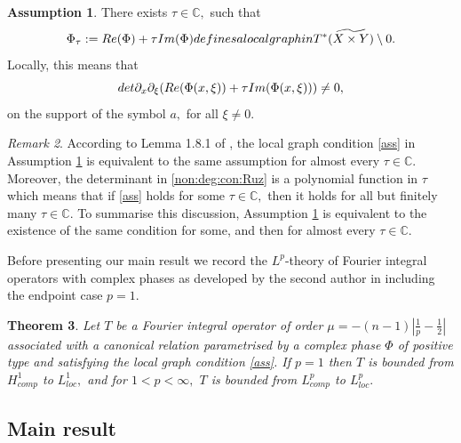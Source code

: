 \documentclass[12pt, reqno]{amsart}
\newtheorem{theorem}{Theorem}[section]
\theoremstyle{definition}
\newtheorem{assumption}[theorem]{Assumption}
\theoremstyle{remark}
\newtheorem{remark}[theorem]{Remark}
\numberwithin{equation}{section}
\begin{document}
\begin{assumption}\label{assumption:local:graph}
 There exists $\tau\in \mathbb{C},$ such that 
    \begin{equation}\label{ass}
     \Phi_\tau:=   \textnormal{Re}(\Phi)+\tau\textnormal{Im}(\Phi) \textnormal{ defines }\textnormal{ a } \textnormal{ local } \textnormal{ graph } \textnormal{ in }T^{*}(\widetilde{X\times Y})\setminus 0.
    \end{equation}   Locally, this means that 
\begin{equation}\label{non:deg:con:Ruz}
        \textnormal{det}\partial_x \partial_\xi(\textnormal{Re}(\Phi(x,\xi))+\tau\textnormal{Im}(\Phi(x,\xi)))\neq 0,
\end{equation}
on the support of the symbol $a,$  for all $\xi\neq 0.$
\end{assumption}
\begin{remark}
    According to Lemma 1.8.1 of \cite{Ruzhansky:CWI-book}, the local graph condition \eqref{ass} in Assumption \ref{assumption:local:graph} is equivalent to the same assumption for almost every $\tau\in \mathbb{C}.$ Moreover, the determinant in  \eqref{non:deg:con:Ruz} is a polynomial function in $\tau$ which means that if   \eqref{ass} holds for some $\tau\in \mathbb{C},$ then it holds for all but finitely many $\tau \in \mathbb{C}.$ To summarise this discussion, Assumption \ref{assumption:local:graph} is equivalent to the existence of the same condition for some, and then for almost every $\tau\in \mathbb{C}.$
\end{remark} 
Before presenting our main result we record the $L^p$-theory of Fourier integral operators with complex phases as developed by the second author in  \cite[Theorems 1.7.1 and 1.7.2]{Ruzhansky:CWI-book} including the endpoint case $p=1.$ 
\begin{theorem}\label{Ruzhansky}  Let $T$ be a Fourier integral operator of order $\mu=-(n-1)|\frac{1}{p}-\frac{1}{2}|$ associated with a canonical relation parametrised by a complex phase $\Phi$  of positive type and satisfying the local graph condition \eqref{ass}. If $p=1$ then $T$ is bounded from $H^1_{comp}$ to $L^1_{loc},$ and for $1<p<\infty,$  $T$ is bounded from $L^p_{comp}$ to $L^p_{loc}.$    
\end{theorem}

\subsection{Main result}
\end{document}
